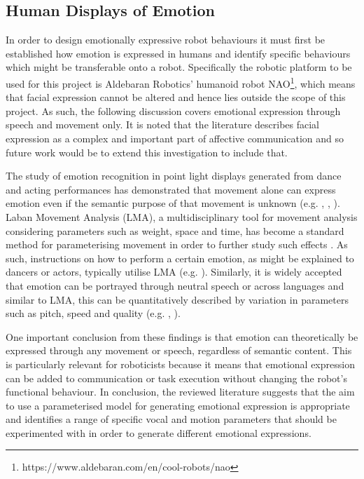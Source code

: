 \documentclass[11pt,a4paper]{report}
\begin{document}
\subsection{Human Displays of Emotion}
In order to design emotionally expressive robot behaviours it must first be established how emotion is expressed in humans and identify specific behaviours which might be transferable onto a robot. Specifically the robotic platform to be used for this project is Aldebaran Robotics' humanoid robot NAO\footnote{https://www.aldebaran.com/en/cool-robots/nao}, which means that facial expression cannot be altered and hence lies outside the scope of this project.  As such, the following discussion covers emotional expression through speech and movement only. It is noted that the literature describes facial expression as a complex and important part of affective communication and so future work would be to extend this investigation to include that.

The study of emotion recognition in point light displays generated from dance and acting performances has demonstrated that movement alone can express emotion even if the semantic purpose of that movement is unknown (e.g. \cite{dittrich1996perception}, \cite{pollick2001perceiving}, \cite{atkinson2004emotion}). Laban Movement Analysis (LMA), a multidisciplinary tool for movement analysis considering parameters such as weight, space and time, has become a standard method for parameterising movement in order to further study such effects \cite{lab2011}. As such, instructions on how to perform a certain emotion, as might be explained to dancers or actors, typically utilise LMA (e.g. \cite{newlove1993laban}). Similarly, it is widely accepted that emotion can be portrayed through neutral speech \cite{neumann2000mood} or across languages \cite{scherer2000cross} and similar to LMA, this can be quantitatively described by variation in parameters such as pitch, speed and quality (e.g. \cite{scherer1986vocal}, \cite{cowie2001emotion}). 

One important conclusion from these findings is that emotion can theoretically be expressed through any movement or speech, regardless of semantic content. This is particularly relevant for roboticists because it means that emotional expression can be added to communication or task execution without changing the robot's functional behaviour. In conclusion, the reviewed literature suggests that the aim to use a parameterised model for generating emotional expression is appropriate and identifies a range of specific vocal and motion parameters that should be experimented with in order to generate different emotional expressions.
\end{document}
